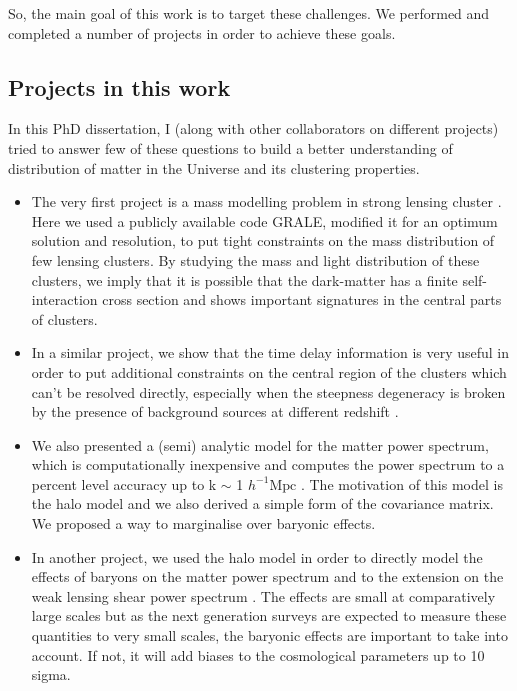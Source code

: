 So, the main goal of this work is to target these challenges. We performed and completed
a number of projects in order to achieve these goals. 


\subsection{Projects in this work}

In this PhD dissertation, I (along with other collaborators on different projects) tried
to answer few of these questions to build a better understanding of distribution of 
matter in the Universe and its clustering properties. 

\begin{itemize}
\item	The very first project is a mass modelling problem in strong lensing cluster
	\cite{2014MNRAS.439.2651M}. Here we
	used a publicly available code GRALE, modified it for an optimum solution and resolution,
	to put tight constraints on the mass distribution of few lensing clusters. By studying
	the mass and light distribution of these clusters, we imply that it is possible 
	that the dark-matter has a finite self-interaction cross section and shows
	important signatures in the central parts of clusters. 

\item	In a similar project, we show that the time delay information is very useful in 
	order to put additional constraints on the central region of the clusters which can't 
	be resolved directly, especially when the steepness degeneracy is broken by the 
	presence of background sources at different redshift \cite{2015PASJ...67...21M}.

\item	We also presented a (semi) analytic model for the matter power spectrum, which is
	computationally inexpensive and computes the power spectrum to a percent level 
	accuracy up to k $\sim$ 1 $h^{-1}\mathrm{Mpc}$ \cite{2014MNRAS.445.3382M}. 
	The motivation of this model is the halo model
	and we also derived a simple form of the covariance matrix. We proposed a way to 
	marginalise over baryonic effects. 

\item	In another project, we used the halo model in order to directly
	model the effects of baryons on the matter power spectrum and to the extension on the
	weak lensing shear power spectrum \cite{2014arXiv1410.6826M}. 
	The effects are small at comparatively large
	scales but as the next generation surveys are expected to measure these quantities 
	to very small scales, the baryonic effects are important to take into account. If not, 
	it will add biases to the cosmological parameters up to 10 sigma. 

\end{itemize}




